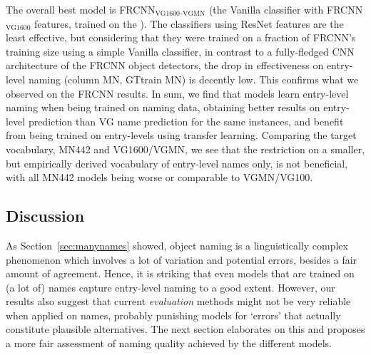 The overall best model is FRCNN$_\text{VG1600}$$_\text{-VGMN}$ (the Vanilla classifier with FRCNN$_\text{VG1600}$ features, trained on the \mn). 
The classifiers using ResNet features are the least effective, but considering that they were trained on a fraction of FRCNN's training size using a simple Vanilla classifier, in contrast to a fully-fledged CNN architecture of the FRCNN object detectors, the drop in effectiveness on entry-level naming (column MN, GTtrain MN) is decently low. This confirms what we observed on the FRCNN results. 
In sum, we find that models learn entry-level naming when being trained on \arbitrary naming data, obtaining better results on entry-level prediction than VG name prediction for the same instances, and benefit from being trained on entry-levels using transfer learning. Comparing the target vocabulary, MN442 and VG1600/VGMN, we see that the restriction on a smaller, but empirically derived vocabulary of entry-level names only, is not beneficial, with all MN442 models being worse or comparable to VGMN/VG100.


\subsection{Discussion}
\label{sect:exp_discussion}

As Section~\ref{sec:manynames} showed, object naming is a linguistically complex phenomenon which involves a lot of variation and potential errors, besides a fair amount of agreement.
Hence, it is striking that even models that are trained on (a lot of) \arbitrary names capture entry-level naming to a good extent.
However, our results also suggest that current \textit{evaluation} methods might not be very reliable when applied on \arbitrary names, probably punishing models for `errors' that actually constitute plausible alternatives.
The next section elaborates on this and proposes a more fair assessment of naming quality achieved by the different models.

